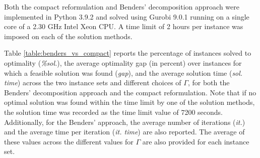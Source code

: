 \documentclass[a4paper,abstracton]{scrartcl}
\begin{document}
Both the compact reformulation and Benders' decomposition approach were implemented in Python 3.9.2 and solved using Gurobi 9.0.1 running on a single core of a 2.30 GHz Intel Xeon CPU. A time limit of 2 hours per instance was imposed on each of the solution methods.

Table \ref{table:benders_vs_compact} reports the percentage of instances solved to optimality (\textit{\%sol.}), the average optimality gap (in percent) over instances for which a feasible solution was found (\textit{gap}), and the average solution time (\textit{sol. time}) across the two instance sets and different choices of $\Gamma$, for both the Benders' decomposition approach and the compact reformulation. Note that if no optimal solution was found within the time limit by one of the solution methods, the solution time was recorded as the time limit value of 7200 seconds. Additionally, for the Benders' approach, the average number of iterations (\textit{it.}) and the average time per iteration (\textit{it. time}) are also reported. The average of these values across the different values for $\Gamma$ are also provided for each instance set.
\end{document}
